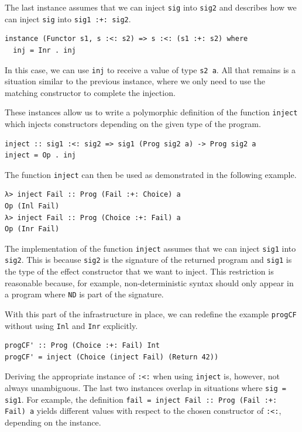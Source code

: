 \documentclass[a4paper, 11pt, fleqn, twoside, abstract=on]{scrreprt}
\newcommand{\hinl}[1]{\texttt{#1}}
\begin{document}
The last instance assumes that we can inject \hinl{sig} into \hinl{sig2} and describes how we can inject \hinl{sig} into \hinl{sig1 :+: sig2}.

\begin{verbatim}
instance (Functor s1, s :<: s2) => s :<: (s1 :+: s2) where
  inj = Inr . inj
\end{verbatim}
\noindent
In this case, we can use \hinl{inj} to receive a value of type \hinl{s2 a}.
All that remains is a situation similar to the previous instance, where we only need to use the matching constructor to complete the injection.
 
These instances allow us to write a polymorphic definition of the function \hinl{inject} which injects constructors depending on the given type of the program.

\begin{verbatim}
inject :: sig1 :<: sig2 => sig1 (Prog sig2 a) -> Prog sig2 a
inject = Op . inj
\end{verbatim}
\noindent
The function \hinl{inject} can then be used as demonstrated in the following example.

\begin{verbatim}
λ> inject Fail :: Prog (Fail :+: Choice) a
Op (Inl Fail)
λ> inject Fail :: Prog (Choice :+: Fail) a
Op (Inr Fail)
\end{verbatim}

The implementation of the function \hinl{inject} assumes that we can inject \hinl{sig1} into \hinl{sig2}.
This is because \hinl{sig2} is the signature of the returned program and \hinl{sig1} is the type of the effect constructor that we want to inject.
This restriction is reasonable because, for example, non-deterministic syntax should only appear in a program where \hinl{ND} is part of the signature.

With this part of the infrastructure in place, we can redefine the example \hinl{progCF} without using \hinl{Inl} and \hinl{Inr} explicitly.

\begin{verbatim}
progCF' :: Prog (Choice :+: Fail) Int
progCF' = inject (Choice (inject Fail) (Return 42))
\end{verbatim}

Deriving the appropriate instance of \hinl{:<:} when using \hinl{inject} is, however, not always unambiguous.
The last two instances overlap in situations where \hinl{sig = sig1}.
For example, the definition \hinl{fail = inject Fail :: Prog (Fail :+: Fail) a} yields different values with respect to the chosen constructor of \hinl{:<:}, depending on the instance.
\end{document}
